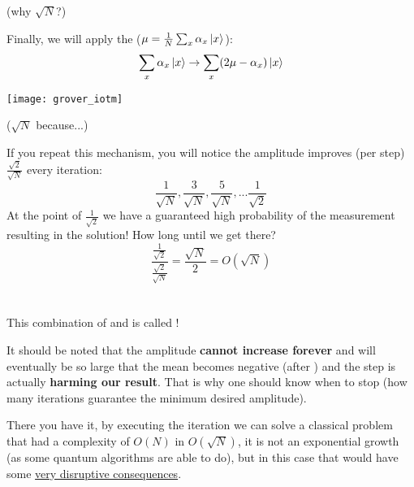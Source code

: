 \documentclass[aspectratio=43]{beamer}
\begin{document}
\begin{frame}{\gvsa (why $\sqrt{N}$?)}
    \begin{cardTiny}
        Finally, we will apply the \iatm ($\mu = \frac{1}{N}\sum_x \alpha_x \ket{x}$):
        \begin{equation*}
            \sum_x \alpha_x \ket{x} \rightarrow \sum_x (2\mu - \alpha_x) \ket{x}
        \end{equation*}
        \begin{center}
            \texttt{[image: grover\_iotm]}
        \end{center}
    \end{cardTiny}
\pagenumber
\end{frame}

\newcommand{\amp}[2]{\frac{#1}{\sqrt{#2}}}
\begin{frame}{\gvsa ($\sqrt{N}$ because...)}
    \begin{card}
        If you repeat this mechanism, you will notice the amplitude improves (per step) $\amp{\sqrt{2}}{N}$ every iteration:
        \begin{equation*}
            \amp{1}{N}, \amp{3}{N}, \amp{5}{N}, ... \amp{1}{2}
        \end{equation*}
        At the point of $\amp{1}{2}$ we have a guaranteed high probability of the measurement resulting in the solution! How long until we get there?
        \begin{equation*}
            \frac{\amp{1}{2}}{\amp{\sqrt{2}}{N}} = \frac{\sqrt{N}}{2} = O(\sqrt{N})
        \end{equation*}
    \end{card}
\pagenumber
\end{frame}

\section{\aamp}
\begin{frame}{\aamp}
    \begin{cardTiny}
        This combination of \phiv and \iatm is called \textbf{\aamp}!
    \end{cardTiny}
    \begin{cardTiny}
        \small{
        It should be noted that the amplitude \textbf{cannot increase forever} and will eventually be so large that the mean becomes negative (after \phiv) and the \iatm step is actually \textbf{harming our result}. That is why one should know when to stop (how many iterations guarantee the minimum desired amplitude).}
    \end{cardTiny}
    \begin{cardTiny}
        There you have it, by executing the \aamp iteration we can solve a classical problem that had a complexity of $O(N)$ in $O(\sqrt{N})$, it is not an exponential growth (as some quantum algorithms are able to do), but in this case that would have some \href{https://en.wikipedia.org/wiki/P_versus_NP_problem}{very disruptive consequences}. 
    \end{cardTiny}
\pagenumber
\end{frame}
\end{document}
